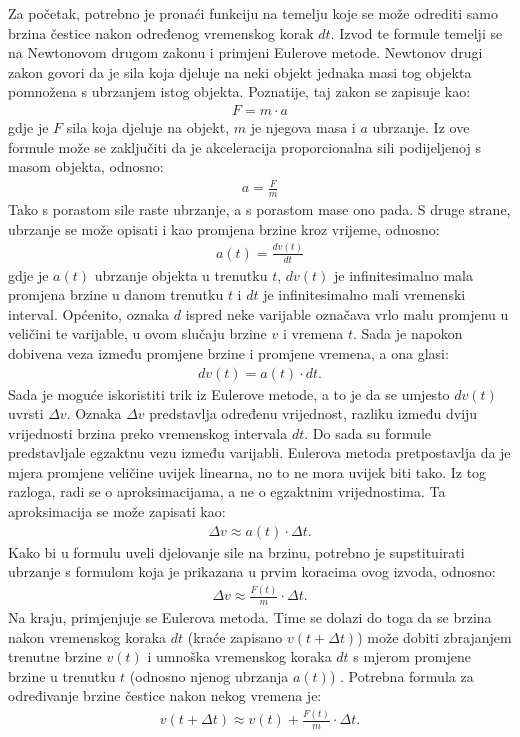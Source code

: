 \documentclass{foi}
\begin{document}
 Za početak, potrebno je pronaći funkciju na temelju koje se može odrediti samo brzina čestice nakon određenog vremenskog korak $dt$. Izvod te formule temelji se na Newtonovom drugom zakonu i primjeni Eulerove metode. Newtonov drugi zakon govori da je sila koja djeluje na neki objekt jednaka masi tog objekta pomnožena s ubrzanjem istog objekta. Poznatije, taj zakon se zapisuje kao:
 \begin{align*}
F = m \cdot a
\end{align*}
gdje je $F$ sila koja djeluje na objekt, $m$ je njegova masa i $a$ ubrzanje. Iz ove formule može se zaključiti da je akceleracija proporcionalna sili podijeljenoj s masom objekta, odnosno:
 \begin{align*}
a = \frac{F}{m}
\end{align*}
Tako s porastom sile raste ubrzanje, a s porastom mase ono pada.  S druge strane, ubrzanje se može opisati i kao promjena brzine kroz vrijeme, odnosno:
 \begin{align*}
a(t) = \frac{dv(t)}{dt}
\end{align*}
gdje je $a(t)$ ubrzanje objekta u trenutku $t$, $dv(t)$ je infinitesimalno mala promjena brzine u danom trenutku $t$ i $dt$ je infinitesimalno mali vremenski interval. Općenito, oznaka $d$ ispred neke varijable označava vrlo malu promjenu u veličini te varijable, u ovom slučaju brzine $v$ i vremena $t$. Sada je napokon dobivena veza između promjene brzine i promjene vremena, a ona glasi:
 \begin{align*}
dv(t) = a(t) \cdot dt.
\end{align*}
Sada je moguće iskoristiti trik iz Eulerove metode, a to je da se umjesto $dv(t)$ uvrsti $\Delta v$. Oznaka $\Delta v$ predstavlja određenu vrijednost, razliku između dviju vrijednosti brzina preko vremenskog intervala $dt$. Do sada su formule predstavljale egzaktnu vezu između varijabli. Eulerova metoda pretpostavlja da je mjera promjene veličine uvijek linearna, no to ne mora uvijek biti tako. Iz tog razloga, radi se o aproksimacijama, a ne o egzaktnim vrijednostima. Ta aproksimacija se može zapisati kao:
 \begin{align*}
\Delta v \approx a(t) \cdot \Delta t.
\end{align*}
Kako bi u formulu uveli djelovanje sile na brzinu, potrebno je supstituirati ubrzanje s formulom koja je prikazana u prvim koracima ovog izvoda, odnosno:
 \begin{align*}
\Delta v \approx \frac{F(t)}{m} \cdot \Delta t.
\end{align*}
Na kraju, primjenjuje se Eulerova metoda. Time se dolazi do toga da se brzina nakon vremenskog koraka $dt$ (kraće zapisano $v(t + \Delta t)$) može dobiti zbrajanjem trenutne brzine $v(t)$ i umnoška vremenskog koraka $dt$ s mjerom promjene brzine u trenutku $t$ (odnosno njenog ubrzanja $a(t)$) \parencite{HjorthJensen2021}. Potrebna formula za određivanje brzine čestice nakon nekog vremena je:
 \begin{align*}
v(t + \Delta t) \approx v(t) + \frac{F(t)}{m} \cdot \Delta t.
\end{align*}
\end{document}

